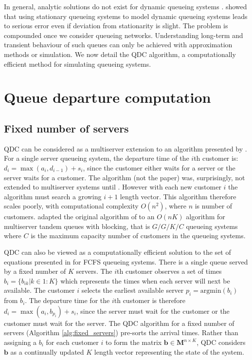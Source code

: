 \documentclass[article]{jss}
\begin{document}
In general, analytic solutions do not exist for dynamic queueing systems \citep{malone1995dynamic, worthington2009reflections}. \citet{green1991some} showed that using stationary queueing systems to model dynamic queueing systems leads to serious error even if deviation from stationarity is slight. The problem is compounded once we consider queueing networks. Understanding long-term and transient behaviour of such queues can only be achieved with approximation methods or simulation. We now detail the QDC algorithm, a computationally efficient method for simulating queueing systems. 

\section{Queue departure computation} \label{sec:QDC}

\subsection{Fixed number of servers}

QDC can be considered as a multiserver extension to an algorithm presented by \citet{lindley_theory_1952}. For a single server queueing system, the departure time of the $i$th customer is: $d_i = \max{(a_i, d_{i-1})} + s_i$, since the customer either waits for a server or the server waits for a customer. The algorithm (not the paper) was, surprisingly, not extended to multiserver systems until \citet{krivulin_recursive_1994}. However with each new customer $i$ the algorithm must search a growing $i+1$ length vector. This algorithm therefore scales poorly, with computational complexity $O(n^2)$, where $n$ is number of customers. \citet{kin_generalized_2010} adapted the original algorithm of \citet{kiefer_theory_1955} to an $O(nK)$ algorithm for multiserver tandem queues with blocking, that is $G/G/K/C$ queueing systems where $C$ is the maximum capacity number of customers in the queueing systems. 

QDC can also be viewed as a computationally efficient solution to the set of equations presented in \citet[pg. 259]{sutton_bayesian_2011} for FCFS queueing systems. There is a single queue served by a fixed number of $K$ servers. The $i$th customer observes a set of times $b_i = \{ b_{ik} | k \in 1:K \}$ which represents the times when each server will next be available. The customer $i$ selects the earliest available server $p_i = \text{argmin}(b_i)$ from $b_i$. The departure time for the $i$th customer is therefore $d_i = \max({a_i, b_{p_i}}) + s_i$, since the server must wait for the customer or the customer must wait for the server. The QDC algorithm for a fixed number of servers (Algorithm \ref{alg:fixed_servers}) pre-sorts the arrival times. Rather than assigning a $b_i$ for each customer $i$ to form the matrix $\mathbf{b} \in \mathbf{M}^{n \times K}$, QDC considers $\mathbf{b}$ as a continually updated $K$ length vector representing the state of the system. 
\end{document}
